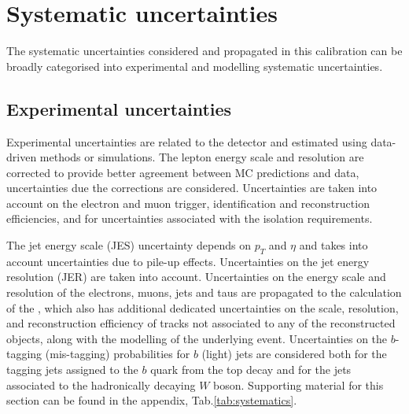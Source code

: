 \section{Systematic uncertainties}
\label{sec:FTAG_systematics}
The systematic uncertainties considered and propagated in this calibration 
can be broadly categorised into experimental and modelling systematic uncertainties. 
\subsection{Experimental uncertainties}
Experimental uncertainties are related to the detector and estimated using 
data-driven methods or simulations. 
The lepton energy scale and resolution are corrected to 
provide better agreement between MC predictions and data, uncertainties 
due the corrections are considered. Uncertainties are taken into account on the 
electron and muon trigger, identification and reconstruction efficiencies, and for 
uncertainties associated with the isolation requirements. 

The jet energy scale (JES) uncertainty depends on $p_T$ and $\eta$ and 
takes into account uncertainties due to pile-up effects. Uncertainties on the jet energy resolution (JER) 
are taken into account. Uncertainties on the energy scale and resolution of 
the electrons, muons, jets and taus are propagated to the calculation of the \MET, 
which also has additional dedicated uncertainties on the scale, resolution, and 
reconstruction efficiency of tracks not associated to any of the reconstructed objects,
 along with the modelling of the underlying event. Uncertainties on the $b$-tagging (mis-tagging) 
 probabilities for $b$ (light) jets are considered both for the tagging jets assigned to the $b$ quark 
 from the top decay and for the jets associated to the hadronically decaying $W$ boson.
Supporting material for this section can be found in the appendix, Tab.\ref{tab:systematics}.

